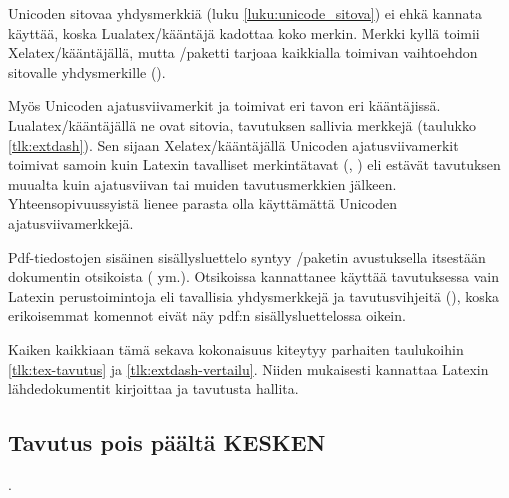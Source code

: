Unicoden sitovaa yhdysmerkkiä 
(luku \ref{luku:unicode_sitova}) ei ehkä kannata käyttää, koska
Lualatex\-/kääntäjä kadottaa koko merkin. Merkki kyllä toimii
Xelatex\-/kääntäjällä, mutta \-/paketti tarjoaa
kaikkialla toimivan vaihtoehdon sitovalle yhdysmerkille (\koodi{\keno
  =/}).

Myös Unicoden ajatusviivamerkit  ja
 toimivat eri tavon eri kääntäjissä.
Lualatex\-/kääntäjällä ne ovat sitovia, tavutuksen sallivia merkkejä
(taulukko \ref{tlk:extdash}). Sen sijaan Xelatex\-/kääntäjällä Unicoden
ajatusviivamerkit toimivat samoin kuin Latexin tavalliset merkintätavat
(\mbox{\koodi{--}}, \mbox{\koodi{---}}) eli estävät tavutuksen muualta
kuin ajatusviivan tai muiden tavutusmerkkien jälkeen.
Yhteensopivuussyistä lienee parasta olla käyttämättä Unicoden
ajatusviivamerkkejä.

Pdf-tiedostojen sisäinen sisällysluettelo syntyy
\-/paketin avustuksella itsestään dokumentin
otsikoista ( ym.). Otsikoissa kannattanee käyttää
tavutuksessa vain Latexin perustoimintoja eli tavallisia yhdysmerkkejä
ja tavutusvihjeitä (\koodi{\keno-}), koska erikoisemmat komennot eivät
näy pdf:n sisällysluettelossa oikein.

Kaiken kaikkiaan tämä sekava kokonaisuus kiteytyy parhaiten taulukoihin
\ref{tlk:tex-tavutus} ja \ref{tlk:extdash-vertailu}. Niiden mukaisesti
kannattaa Latexin lähdedokumentit kirjoittaa ja tavutusta hallita.

\subsection{Tavutus pois päältä KESKEN}

.

